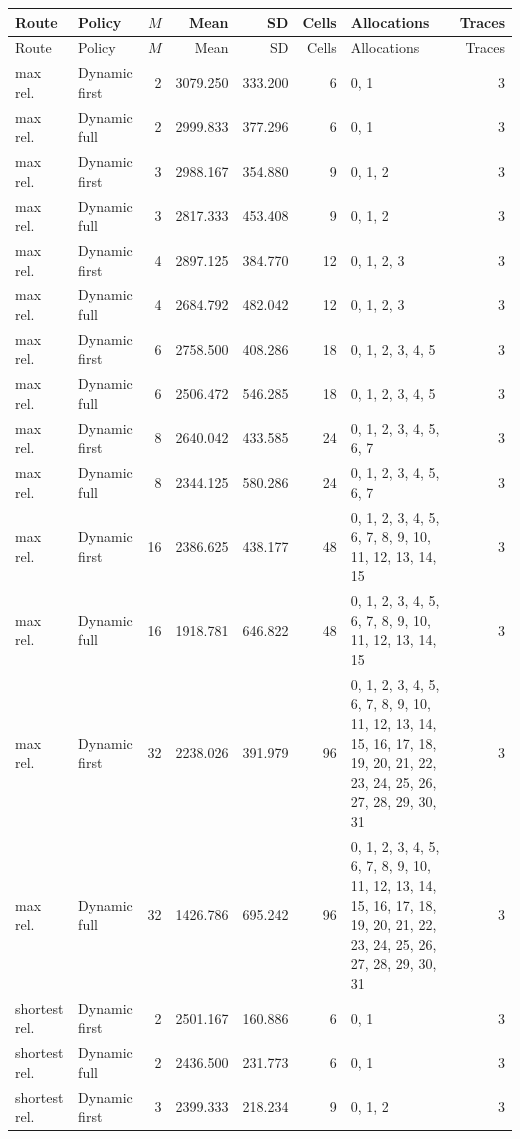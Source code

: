 \documentclass[10pt,a4paper]{article}
\begin{document}
\tiny\setlength{\tabcolsep}{2pt}\begin{longtable}{@{}p{23mm}p{29mm}rrrrp{36mm}r@{}}
\toprule Route & Policy & $M$ & Mean & SD & Cells & Allocations & Traces \\ \midrule\endfirsthead
\toprule Route & Policy & $M$ & Mean & SD & Cells & Allocations & Traces \\ \midrule\endhead
\bottomrule\endfoot
max rel. & Dynamic first & 2 & 3079.250 & 333.200 & 6 & 0, 1 & 3 \\
max rel. & Dynamic full & 2 & 2999.833 & 377.296 & 6 & 0, 1 & 3 \\
max rel. & Dynamic first & 3 & 2988.167 & 354.880 & 9 & 0, 1, 2 & 3 \\
max rel. & Dynamic full & 3 & 2817.333 & 453.408 & 9 & 0, 1, 2 & 3 \\
max rel. & Dynamic first & 4 & 2897.125 & 384.770 & 12 & 0, 1, 2, 3 & 3 \\
max rel. & Dynamic full & 4 & 2684.792 & 482.042 & 12 & 0, 1, 2, 3 & 3 \\
max rel. & Dynamic first & 6 & 2758.500 & 408.286 & 18 & 0, 1, 2, 3, 4, 5 & 3 \\
max rel. & Dynamic full & 6 & 2506.472 & 546.285 & 18 & 0, 1, 2, 3, 4, 5 & 3 \\
max rel. & Dynamic first & 8 & 2640.042 & 433.585 & 24 & 0, 1, 2, 3, 4, 5, 6, 7 & 3 \\
max rel. & Dynamic full & 8 & 2344.125 & 580.286 & 24 & 0, 1, 2, 3, 4, 5, 6, 7 & 3 \\
max rel. & Dynamic first & 16 & 2386.625 & 438.177 & 48 & 0, 1, 2, 3, 4, 5, 6, 7, 8, 9, 10, 11, 12, 13, 14, 15 & 3 \\
max rel. & Dynamic full & 16 & 1918.781 & 646.822 & 48 & 0, 1, 2, 3, 4, 5, 6, 7, 8, 9, 10, 11, 12, 13, 14, 15 & 3 \\
max rel. & Dynamic first & 32 & 2238.026 & 391.979 & 96 & 0, 1, 2, 3, 4, 5, 6, 7, 8, 9, 10, 11, 12, 13, 14, 15, 16, 17, 18, 19, 20, 21, 22, 23, 24, 25, 26, 27, 28, 29, 30, 31 & 3 \\
max rel. & Dynamic full & 32 & 1426.786 & 695.242 & 96 & 0, 1, 2, 3, 4, 5, 6, 7, 8, 9, 10, 11, 12, 13, 14, 15, 16, 17, 18, 19, 20, 21, 22, 23, 24, 25, 26, 27, 28, 29, 30, 31 & 3 \\
shortest rel. & Dynamic first & 2 & 2501.167 & 160.886 & 6 & 0, 1 & 3 \\
shortest rel. & Dynamic full & 2 & 2436.500 & 231.773 & 6 & 0, 1 & 3 \\
shortest rel. & Dynamic first & 3 & 2399.333 & 218.234 & 9 & 0, 1, 2 & 3 \\

\end{longtable}
\end{document}

